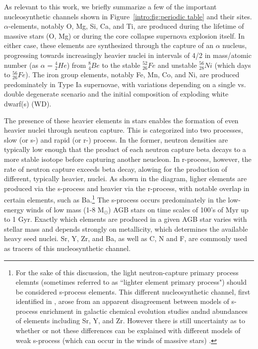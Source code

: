 As relevant to this work, we briefly summarize a few of the important nucleosynthetic channels shown in Figure~\ref{intro:fig:periodic table} and their sites. $\alpha$-elements, notably O, Mg, Si, Ca, and Ti, are produced during the lifetime of massive stars (O, Mg) or during the core collapse supernova explosion itself. In either case, these elements are synthesized through the capture of an $\alpha$ nucleus, progressing towards increasingly heavier nuclei in intervals of 4/2 in mass/atomic number (as $\alpha$ = $^{4}_2He$) from $^8_4Be$ to the stable $^{52}_{26}Fe$ and unstable $^{56}_{28}Ni$ (which days to $^{56}_{26}Fe$). The iron group elements, notably Fe, Mn, Co, and Ni, are produced predominately in Type Ia supernovae, with variations depending on a single vs. double degenerate scenario and the initial composition of exploding white dwarf(s) (WD).

The presence of these heavier elements in stars enables the formation of even heavier nuclei through neutron capture. This is categorized into two processes, slow (or s-) and rapid (or r-) process. In the former, neutron densities are typically low enough that the product of each neutron capture beta decays to a more stable isotope before capturing another neucleon. In r-process, however, the rate of neutron capture exceeds beta decay, alowing for the production of different, typically heavier, nuclei. As shown in the diagram, ligher elements are produced via the s-process and heavier via the r-process, with notable overlap in certain elements, such as Ba.\footnote{For the sake of this discussion, the light neutron-capture primary process elemnts (sometimes referred to as ``lighter element primary process") should be considered s-process elements. This different nucleosynthetic channel, first identified in \cite{Travaglio2004}, arose from an apparent disagreement between models of s-process enrichment in galactic chemical evolution studies andnd abundances of elements including Sr, Y, and Zr. However there is still uncertainty as to whether or not these differences can be explained with different models of weak s-process (which can occur in the winds of massive stars) \citep[e.g.][]{Prantzos2018}.} The s-process occurs predominately in the low-energy winds of low mass (1-8 M$_{\odot}$) AGB stars on time scales of 100's of Myr up to 1 Gyr. Exactly which elements are produced in a given AGB star varies with stellar mass and depends strongly on metallicity, which determines the available heavy seed nuclei. Sr, Y, Zr, and Ba, as well as C, N and F, are commonly used as tracers of this nucleosynthetic channel.

